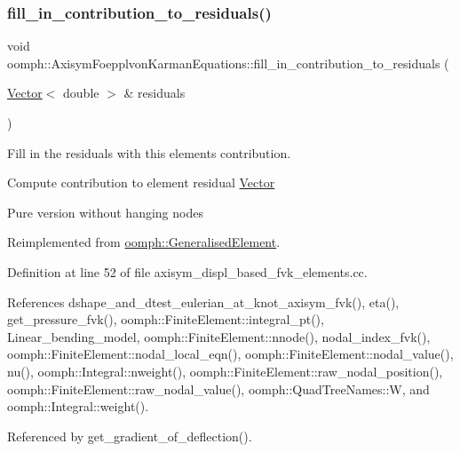 \subsubsection{\texorpdfstring{fill\+\_\+in\+\_\+contribution\+\_\+to\+\_\+residuals()}{fill\_in\_contribution\_to\_residuals()}\hspace{0.1cm}{\footnotesize\ttfamily [1/2]}}
{\footnotesize\ttfamily void oomph\+::\+Axisym\+Foepplvon\+Karman\+Equations\+::fill\+\_\+in\+\_\+contribution\+\_\+to\+\_\+residuals (\begin{DoxyParamCaption}\item[{\hyperlink{classoomph_1_1Vector}{Vector}$<$ double $>$ \&}]{residuals }\end{DoxyParamCaption})\hspace{0.3cm}{\ttfamily [virtual]}}



Fill in the residuals with this element\textquotesingle{}s contribution. 

Compute contribution to element residual \hyperlink{classoomph_1_1Vector}{Vector}

Pure version without hanging nodes 

Reimplemented from \hyperlink{classoomph_1_1GeneralisedElement_a310c97f515e8504a48179c0e72c550d7}{oomph\+::\+Generalised\+Element}.



Definition at line 52 of file axisym\+\_\+displ\+\_\+based\+\_\+fvk\+\_\+elements.\+cc.



References dshape\+\_\+and\+\_\+dtest\+\_\+eulerian\+\_\+at\+\_\+knot\+\_\+axisym\+\_\+fvk(), eta(), get\+\_\+pressure\+\_\+fvk(), oomph\+::\+Finite\+Element\+::integral\+\_\+pt(), Linear\+\_\+bending\+\_\+model, oomph\+::\+Finite\+Element\+::nnode(), nodal\+\_\+index\+\_\+fvk(), oomph\+::\+Finite\+Element\+::nodal\+\_\+local\+\_\+eqn(), oomph\+::\+Finite\+Element\+::nodal\+\_\+value(), nu(), oomph\+::\+Integral\+::nweight(), oomph\+::\+Finite\+Element\+::raw\+\_\+nodal\+\_\+position(), oomph\+::\+Finite\+Element\+::raw\+\_\+nodal\+\_\+value(), oomph\+::\+Quad\+Tree\+Names\+::W, and oomph\+::\+Integral\+::weight().



Referenced by get\+\_\+gradient\+\_\+of\+\_\+deflection().

\mbox{\label{classoomph_1_1AxisymFoepplvonKarmanEquations_a18148b60b9a4addc513f1aed354bd63d}} 
